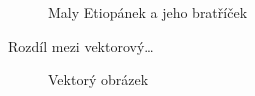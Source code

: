 \documentclass[a4paper,11pt]{article}
\begin{document}
\begin{figure}[h]
{    
    }
    \caption{Maly Etiopánek a jeho bratříček}
    \label{figure:etiopan}
\end{figure}
\newpage
Rozdíl mezi vektorový\dots
\begin{figure}[h]
    \centering
    \caption{Vektorý obrázek}
    \label{figure:oniisan.ep}
\end{figure}
\end{document}
